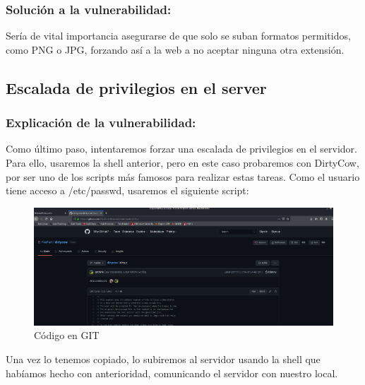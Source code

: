 \documentclass[12pt,twoside]{article}
\begin{document}
\subsubsection*{Solución a  la vulnerabilidad:}
Sería de vital importancia asegurarse de que solo se suban formatos permitidos, como PNG o JPG, forzando así a la web a no aceptar ninguna otra extensión. 

\subsection{Escalada de privilegios en el server}
\subsubsection*{Explicación de la vulnerabilidad:}
Como último paso, intentaremos forzar una escalada de privilegios en el servidor. Para ello, usaremos la shell anterior, pero en este caso probaremos con DirtyCow, por ser uno de los scripts más famosos para realizar estas tareas. 
Como el usuario tiene acceso a /etc/passwd, usaremos el siguiente script:
\begin{figure}[H]
    \centering
    \includegraphics[scale=0.3]{./imagenes/dirtycow_1}
    \caption{Código en GIT}
\end{figure}
Una vez lo tenemos copiado, lo subiremos al servidor usando la shell que habíamos hecho con anterioridad, comunicando el servidor con nuestro local. 
\end{document}
